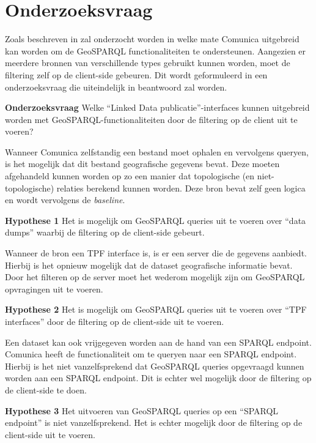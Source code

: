 \section{Onderzoeksvraag}
\label{sec:onderzoeksvraag}
Zoals beschreven in  zal onderzocht worden in welke mate Comunica uitgebreid kan worden om de GeoSPARQL functionaliteiten te ondersteunen. Aangezien er meerdere bronnen van verschillende types gebruikt kunnen worden, moet de filtering zelf op de client-side gebeuren. Dit wordt geformuleerd in een onderzoeksvraag die uiteindelijk in  beantwoord zal worden. 

\textbf{Onderzoeksvraag} Welke ``Linked Data publicatie''-interfaces kunnen uitgebreid worden met GeoSPARQL-functionaliteiten door de filtering op de client uit te voeren?

Wanneer Comunica zelfstandig een bestand moet ophalen en vervolgens queryen, is het mogelijk dat dit bestand geografische gegevens bevat. Deze moeten afgehandeld kunnen worden op zo een manier dat topologische (en niet-topologische) relaties berekend kunnen worden. Deze bron bevat zelf geen logica en wordt vervolgens de \textit{baseline}.

\textbf{Hypothese 1} Het is mogelijk om GeoSPARQL queries uit te voeren over ``data dumps'' waarbij de filtering op de client-side gebeurt.

Wanneer de bron een TPF interface is, is er een server die de gegevens aanbiedt. Hierbij is het opnieuw mogelijk dat de dataset geografische informatie bevat. Door het filteren op de server moet het wederom mogelijk zijn om GeoSPARQL opvragingen uit te voeren.

\textbf{Hypothese 2} Het is mogelijk om GeoSPARQL queries uit te voeren over ``TPF interfaces'' door de filtering op de client-side uit te voeren.

Een dataset kan ook vrijgegeven worden aan de hand van een SPARQL endpoint. Comunica heeft de functionaliteit om te queryen naar een SPARQL endpoint. Hierbij is het niet vanzelfsprekend dat GeoSPARQL queries opgevraagd kunnen worden aan een SPARQL endpoint. Dit is echter wel mogelijk door de filtering op de client-side te doen.

\textbf{Hypothese 3} Het uitvoeren van GeoSPARQL queries op een ``SPARQL endpoint'' is niet vanzelfsprekend. Het is echter mogelijk door de filtering op de client-side uit te voeren.